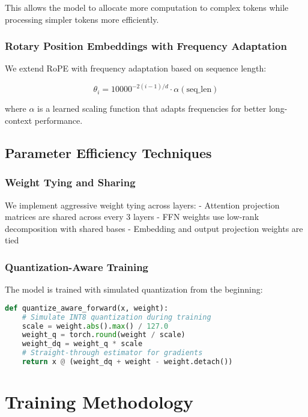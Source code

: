 \documentclass[11pt,a4paper]{article}
\begin{document}
This allows the model to allocate more computation to complex tokens while processing simpler tokens more efficiently.

\subsubsection{Rotary Position Embeddings with Frequency Adaptation}

We extend RoPE with frequency adaptation based on sequence length:

\begin{equation}
\theta_i = 10000^{-2(i-1)/d} \cdot \alpha(\text{seq\_len})
\end{equation}

where $\alpha$ is a learned scaling function that adapts frequencies for better long-context performance.

\subsection{Parameter Efficiency Techniques}

\subsubsection{Weight Tying and Sharing}

We implement aggressive weight tying across layers:
- Attention projection matrices are shared across every 3 layers
- FFN weights use low-rank decomposition with shared bases
- Embedding and output projection weights are tied

\subsubsection{Quantization-Aware Training}

The model is trained with simulated quantization from the beginning:

\begin{lstlisting}[language=Python]
def quantize_aware_forward(x, weight):
    # Simulate INT8 quantization during training
    scale = weight.abs().max() / 127.0
    weight_q = torch.round(weight / scale)
    weight_dq = weight_q * scale
    # Straight-through estimator for gradients
    return x @ (weight_dq + weight - weight.detach())
\end{lstlisting}

\section{Training Methodology}
\end{document}

